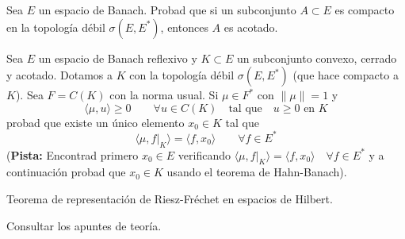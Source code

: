 \documentclass[12pt]{article}
\begin{document}
    \begin{ejercicio}[2.5 puntos]
        Sea $E$ un espacio de Banach. Probad que si un subconjunto $A\subset E$ es compacto en la topología débil $\sigma(E,E^\ast)$, entonces $A$ es acotado.
    \end{ejercicio}

    \begin{ejercicio}[2 puntos]
        Sea $E$ un espacio de Banach reflexivo y $K\subset E$ un subconjunto convexo, cerrado y acotado. Dotamos a $K$ con la topología débil $\sigma(E,E^\ast)$ (que hace compacto a $K$). Sea $F=C(K)$ con la norma usual. Si $\mu\in F^\ast$ con $\|\mu\| = 1$ y
        \begin{equation*}
            \langle \mu,u \rangle \geq 0 \qquad \forall u\in C(K) \quad \text{tal que}\quad u\geq 0 \text{\ en\ } K
        \end{equation*}
        probad que existe un único elemento $x_0\in K$ tal que
        \begin{equation*}
            \langle \mu, f\big|_{K} \rangle  = \langle f,x_0 \rangle  \qquad \forall f\in E^\ast
        \end{equation*}
        (\textbf{Pista:} Encontrad primero $x_0\in E$ verificando $\langle \mu,f\big|_K \rangle = \langle f,x_0 \rangle\quad  \forall f\in E^\ast  $ y a continuación probad que $x_0\in K$ usando el teorema de Hahn-Banach).
    \end{ejercicio}


    \newpage
    \setcounter{ejercicio}{0} %

    \begin{ejercicio}[3 puntos]
        Teorema de representación de Riesz-Fréchet en espacios de Hilbert.
    \end{ejercicio}
    Consultar los apuntes de teoría.
    \newpage
\end{document}
